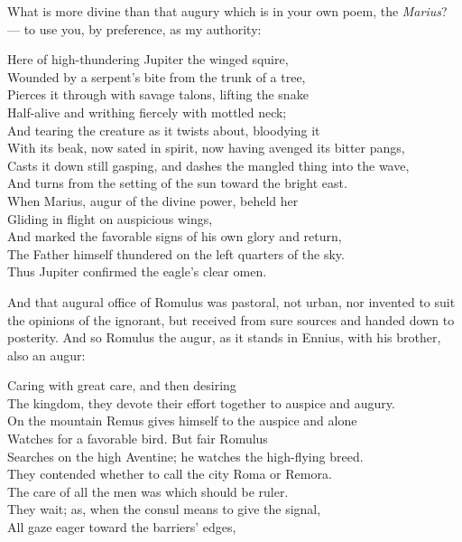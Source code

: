  What is more divine than that augury which is in your own poem, the \textit{Marius}? — to use you, by preference, as my authority:

Here of high-thundering Jupiter the winged squire, \\
Wounded by a serpent's bite from the trunk of a tree, \\
Pierces it through with savage talons, lifting the snake \\
Half-alive and writhing fiercely with mottled neck; \\
And tearing the creature as it twists about, bloodying it \\
With its beak, now sated in spirit, now having avenged its bitter pangs, \\
Casts it down still gasping, and dashes the mangled thing into the wave, \\
And turns from the setting of the sun toward the bright east. \\
When Marius, augur of the divine power, beheld her \\
Gliding in flight on auspicious wings, \\
And marked the favorable signs of his own glory and return, \\
The Father himself thundered on the left quarters of the sky. \\
Thus Jupiter confirmed the eagle's clear omen.

 And that augural office of Romulus was pastoral, not urban, nor invented to suit the opinions of the ignorant, but received from sure sources and handed down to posterity. And so Romulus the augur, as it stands in Ennius, with his brother, also an augur:

Caring with great care, and then desiring \\
The kingdom, they devote their effort together to auspice and augury. \\
On the mountain Remus gives himself to the auspice and alone \\
Watches for a favorable bird. But fair Romulus \\
Searches on the high Aventine; he watches the high-flying breed. \\
They contended whether to call the city Roma or Remora. \\
The care of all the men was which should be ruler. \\
They wait; as, when the consul means to give the signal, \\
All gaze eager toward the barriers' edges,

